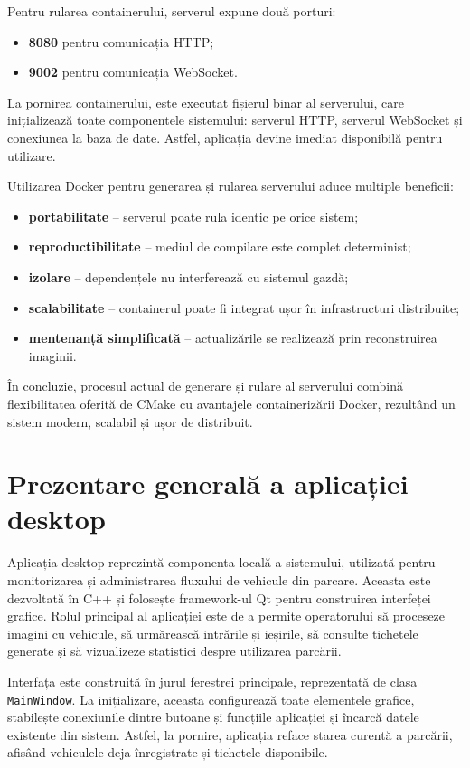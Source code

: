 Pentru rularea containerului, serverul expune două porturi:
\begin{itemize}
    \item \textbf{8080} pentru comunicația HTTP;
    \item \textbf{9002} pentru comunicația WebSocket.
\end{itemize}

La pornirea containerului, este executat fișierul binar al serverului, care inițializează toate componentele sistemului: serverul HTTP, serverul WebSocket și conexiunea la baza de date. Astfel, aplicația devine imediat disponibilă pentru utilizare.

Utilizarea Docker pentru generarea și rularea serverului aduce multiple beneficii:
\begin{itemize}
    \item \textbf{portabilitate} – serverul poate rula identic pe orice sistem;
    \item \textbf{reproductibilitate} – mediul de compilare este complet determinist;
    \item \textbf{izolare} – dependențele nu interferează cu sistemul gazdă;
    \item \textbf{scalabilitate} – containerul poate fi integrat ușor în infrastructuri distribuite;
    \item \textbf{mentenanță simplificată} – actualizările se realizează prin reconstruirea imaginii.
\end{itemize}

În concluzie, procesul actual de generare și rulare al serverului combină flexibilitatea oferită de CMake cu avantajele containerizării Docker, rezultând un sistem modern, scalabil și ușor de distribuit.

\section{Prezentare generală a aplicației desktop}

Aplicația desktop reprezintă componenta locală a sistemului, utilizată pentru monitorizarea și administrarea fluxului de vehicule din parcare. Aceasta este dezvoltată în C++ și folosește framework-ul Qt pentru construirea interfeței grafice. Rolul principal al aplicației este de a permite operatorului să proceseze imagini cu vehicule, să urmărească intrările și ieșirile, să consulte tichetele generate și să vizualizeze statistici despre utilizarea parcării.

Interfața este construită în jurul ferestrei principale, reprezentată de clasa \texttt{MainWindow}. La inițializare, aceasta configurează toate elementele grafice, stabilește conexiunile dintre butoane și funcțiile aplicației și încarcă datele existente din sistem. Astfel, la pornire, aplicația reface starea curentă a parcării, afișând vehiculele deja înregistrate și tichetele disponibile.

